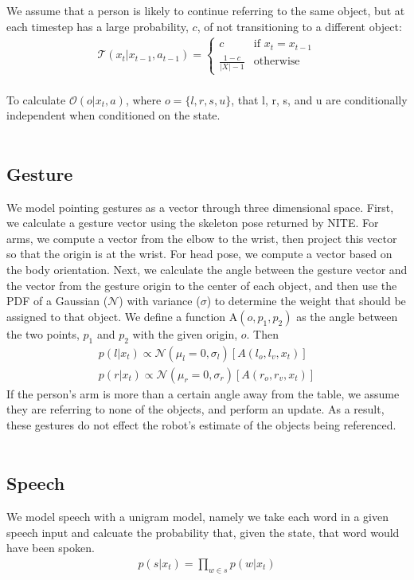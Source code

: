 \documentclass[graybox]{svmult}
\begin{document}
We assume that a person is likely to continue referring to the same
object, but at each timestep has a large probability, $c$, of
not transitioning to a different object: 
\begin{align}
\mathcal{T}(x_t| x_{t-1}, a_{t-1}) = \left\{  \begin{array}{ll}
c &\mbox{if } x_t = x_{t-1}\\
\frac{1-c}{|X| -1} &\mbox{otherwise}
\end{array}\right.
\end{align}\\
To calculate $\mathcal{O}(o | x_t, a)$, where $o = \{l, r, s, u\}$, that l, r,
s, and u are conditionally independent when conditioned on the state.\\\\
\subsection{Gesture}
We model pointing gestures as a vector
through three dimensional space.  First, we calculate a gesture vector
using the skeleton pose returned by NITE.  For arms, we compute a
vector from the elbow to the wrist, then project this vector so that the origin is at the wrist.  For head pose, we compute a
vector based on the body orientation. Next, we calculate the angle between the gesture
vector and the vector from the gesture origin to the center of each object, and then use the PDF of a Gaussian ($\mathcal{N}$) with
variance ($\sigma$) to determine the weight that should be assigned to
that object. We define a function $\mbox{A}(o, p_1, p_2)$ as the angle
between the two points, $p_1$ and $p_2$ with the given origin, $o$.
Then
\begin{align}
p(l | x_t) \propto \mathcal{N}(\mu_l=0, \sigma_l)[A(l_o, l_v, x_t)]\\
p(r | x_t) \propto \mathcal{N}(\mu_r=0, \sigma_r)[A(r_o, r_v, x_t)]
\end{align}
If the person's arm is more than a certain angle away from the table,
we assume they are referring to none of the objects, and perform an
update.  As a result, these gestures do not effect the robot's
estimate of the objects being referenced.\\\\
\subsection{Speech}
We model speech with a unigram model, namely we
take each word in a given speech input and calcuate the probability that, given the state, that word would have been spoken.
\begin{align}
p(s |x_t) = \displaystyle \prod_{w \in s} p(w | x_t)
\end{align}
\end{document}
